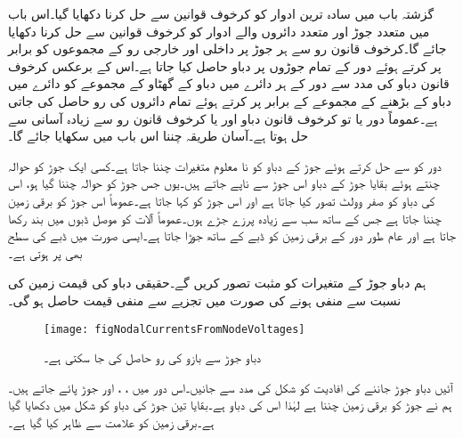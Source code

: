 گزشتہ باب میں سادہ ترین ادوار کو کرخوف قوانین سے حل کرنا دکھایا گیا۔اس باب میں متعدد جوڑ اور متعدد دائروں والے ادوار کو کرخوف قوانین سے حل کرنا دکھایا جائے گا۔کرخوف قانون رو سے ہر جوڑ پر داخلی اور خارجی رو کے مجموعوں کو برابر پر کرتے ہوئے دور کے تمام جوڑوں پر دباو حاصل کیا جاتا ہے۔اس کے برعکس کرخوف قانون دباو کی مدد سے دور کے ہر دائرے میں دباو کے گھٹاو کے مجموعے کو دائرے میں دباو کے  بڑھنے کے مجموعے کے برابر پر کرتے ہوئے تمام دائروں کی رو حاصل کی جاتی ہے۔عموماً  دور یا تو کرخوف قانون دباو اور یا کرخوف قانون رو سے زیادہ آسانی سے حل ہوتا ہے۔آسان طریقہ چننا اس باب میں سکھایا جائے گا۔

دور کو  سے حل کرتے ہوئے  جوڑ کے دباو کو  نا معلوم متغیرات چننا جاتا ہے۔کسی ایک جوڑ کو حوالہ چنتے ہوئے بقایا جوڑ کے دباو اس جوڑ سے ناپے جاتے ہیں۔یوں جس جوڑ کو حوالہ چننا گیا ہو، اس کی دباو کو صفر وولٹ تصور کیا جاتا ہے اور اس جوڑ کو   کہا جاتا ہے۔عموماً اس جوڑ کو برقی زمین چننا جاتا ہے جس کے ساتھ سب سے زیادہ پرزے جڑے ہوں۔عموماً آلات کو موصل ڈبوں میں بند رکھا جاتا ہے اور عام طور دور کے برقی زمین کو ڈبے کے ساتھ جوڑا جاتا ہے۔ایسی صورت میں ڈبے کی سطح  بھی  پر ہوتی ہے۔

ہم دباو جوڑ کے متغیرات کو مثبت تصور کریں گے۔حقیقی دباو کی قیمت زمین کی نسبت سے منفی ہونے کی صورت میں تجزیے سے منفی قیمت حاصل ہو گی۔ 

\begin{figure}
\centering
\texttt{[image: figNodalCurrentsFromNodeVoltages]}
\caption{دباو جوڑ سے بازو کی رو حاصل کی جا سکتی ہے۔}
\label{شکل_جوڑ_دباو__جوڑ_سے_رو_کا_حصول}
\end{figure}

آئیں دباو جوڑ جاننے کی افادیت کو  شکل  کی مدد سے جانیں۔اس دور میں ، ،  اور  جوڑ پائے جاتے ہیں۔ہم نے جوڑ  کو برقی زمین چننا ہے لہٰذا اس کی دباو  ہے۔بقایا تین جوڑ کی دباو کو شکل میں دکھایا گیا ہے۔برقی زمین کو علامت سے ظاہر کیا گیا ہے۔

